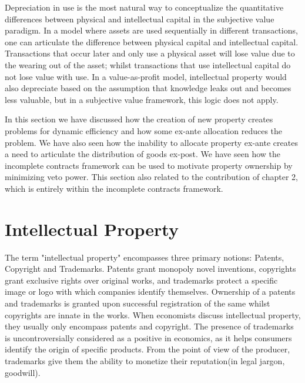 Depreciation in use is the most natural way to conceptualize the quantitative differences between physical and intellectual capital in the subjective value paradigm. In a model where assets are used sequentially in different transactions, one can articulate the difference between physical capital and intellectual capital. Transactions that occur later and only use a physical asset will lose value due to the wearing out of the asset; whilst transactions that use intellectual capital do not lose value with use. In a value-as-profit model, intellectual property would also depreciate based on the assumption that knowledge leaks out and becomes less valuable, but in a subjective value framework, this logic does not apply.

In this section we have discussed how the creation of new property creates problems for dynamic efficiency and how some ex-ante allocation reduces the problem. We have also seen how the inability to allocate property ex-ante creates a need to articulate the distribution of goods ex-post. We have seen how the incomplete contracts framework can be used to motivate property ownership by minimizing veto power. This section also related to the contribution of chapter 2, which is entirely within the incomplete contracts framework.

\newpage
\section{Intellectual Property}\label{intellectual}

The term "intellectual property" encompasses three primary notions: Patents, Copyright and Trademarks. Patents grant monopoly novel inventions, copyrights grant exclusive rights over original works, and trademarks protect a specific image or logo with which companies identify themselves. Ownership of a patents and trademarks is granted upon successful registration of the same whilst copyrights are innate in the works. When economists discuss intellectual property, they usually only encompass patents and copyright. The presence of trademarks is uncontroversially considered as a positive in economics, as it helps consumers identify the origin of specific products. From the point of view of the producer, trademarks give them the ability to monetize their reputation(in legal jargon, goodwill). 


